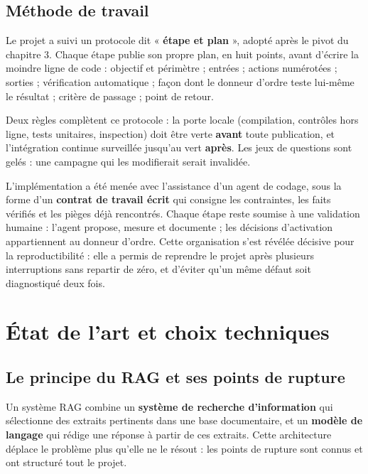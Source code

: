 \documentclass[a4paper,12pt]{report}
\begin{document}
\section{Méthode de travail}
Le projet a suivi un protocole dit « \textbf{étape et plan} », adopté après le pivot du
chapitre 3. Chaque étape publie son propre plan, en huit points, avant d'écrire la moindre ligne
de code : objectif et périmètre ; entrées ; actions numérotées ; sorties ; vérification
automatique ; façon dont le donneur d'ordre teste lui-même le résultat ; critère de passage ;
point de retour.

Deux règles complètent ce protocole : la porte locale (compilation, contrôles hors ligne, tests
unitaires, inspection) doit être verte \textbf{avant} toute publication, et l'intégration continue
surveillée jusqu'au vert \textbf{après}. Les jeux de questions sont gelés : une campagne qui les
modifierait serait invalidée.

L'implémentation a été menée avec l'assistance d'un agent de codage, sous la forme d'un
\textbf{contrat de travail écrit} qui consigne les contraintes, les faits vérifiés et les pièges
déjà rencontrés. Chaque étape reste soumise à une validation humaine : l'agent propose, mesure et
documente ; les décisions d'activation appartiennent au donneur d'ordre. Cette organisation s'est
révélée décisive pour la reproductibilité : elle a permis de reprendre le projet après plusieurs
interruptions sans repartir de zéro, et d'éviter qu'un même défaut soit diagnostiqué deux fois.

\chapter{État de l'art et choix techniques}

\section{Le principe du RAG et ses points de rupture}
Un système RAG combine un \textbf{système de recherche d'information} qui sélectionne des extraits
pertinents dans une base documentaire, et un \textbf{modèle de langage} qui rédige une réponse à
partir de ces extraits. Cette architecture déplace le problème plus qu'elle ne le résout : les
points de rupture sont connus et ont structuré tout le projet.
\end{document}
